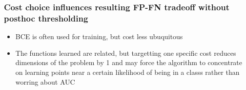 \documentclass{beamer}
\newcommand{\CO}{{\hat w}}
\begin{document}
\begin{frame}
\frametitle{Cost choice influences resulting FP-FN tradeoff without posthoc thresholding}
\begin{itemize}
\item
  BCE is often used for training, but cost less ubuquitous
\item
  The functions learned are related, but targetting one specific cost reduces dimensions of the problem by 1 and may force the algorithm to concentrate on learning points near a certain likelihood of being in a classs rather than worring about AUC
\end{itemize}
\end{frame}
\end{document}
